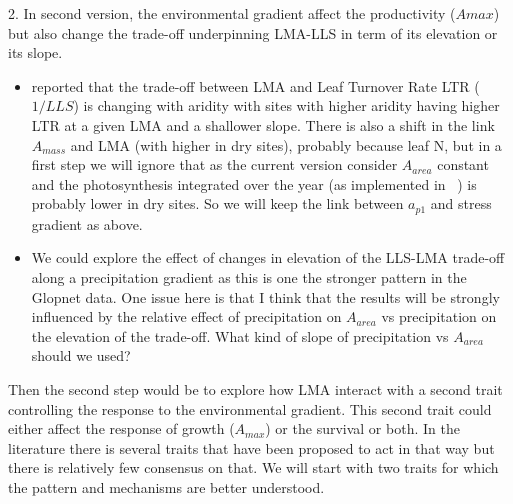 \documentclass[a4paper,11pt]{article}
\begin{document}
2. In second version, the environmental gradient affect the productivity ($A{max}$) but also change the trade-off underpinning LMA-LLS in term of its elevation or its slope.

\begin{itemize}
\item \citet{Wright-2005} reported that the trade-off between LMA and Leaf Turnover Rate LTR ($1/LLS$) is changing with aridity with sites with higher aridity having higher LTR at a given LMA and a shallower slope. There is also a shift in the link $A_{mass}$ and LMA (with higher in dry sites), probably because leaf N, but in a first step we will ignore that as the current version consider $A_{area}$ constant and the photosynthesis integrated over the year (as implemented in \plant\ ) is probably lower in dry sites. So we will keep the link between $a_{p1}$ and stress gradient as above.


\item We could explore the effect of changes in elevation of the LLS-LMA trade-off along a precipitation gradient as this is one the stronger pattern in the Glopnet data. One issue here is that I think that the results will be strongly influenced by the relative effect of precipitation on $A_{area}$ vs precipitation on the elevation of the trade-off. What kind of slope of precipitation vs $A_{area}$ should we used?

\end{itemize}

Then the second step would be to explore how LMA interact with a second trait controlling the response to the environmental gradient. This second trait could either affect the response of growth ($A_{max}$) or the survival or both. In the literature there is several traits that have been proposed to act in that way but there is relatively few consensus on that. We will start with two traits for which the pattern and mechanisms are better understood.
\end{document}
